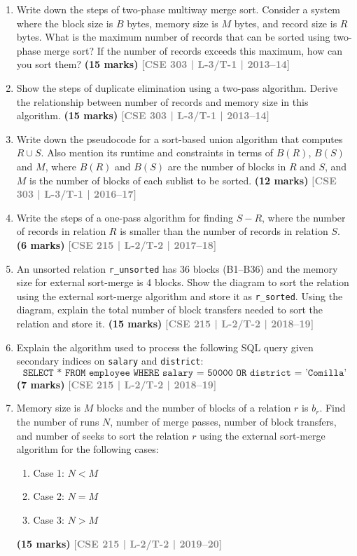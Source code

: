 \documentclass[12pt,a3paper]{article}
\newcommand{\yr}[1]{\hfill\textcolor{gray}{\small\textbf{[#1]}}}
\newcommand{\mk}[1]{\textcolor{orange!70!black}{\small\textbf{(#1 marks)}}}
\begin{document}
\begin{enumerate}
\item Write down the steps of two-phase multiway merge sort. Consider a system where the block size is $B$ bytes, memory size is $M$ bytes, and record size is $R$ bytes. What is the maximum number of records that can be sorted using two-phase merge sort? If the number of records exceeds this maximum, how can you sort them?
\mk{15} \yr{CSE 303 | L-3/T-1 | 2013--14}

\item Show the steps of duplicate elimination using a two-pass algorithm. Derive the relationship between number of records and memory size in this algorithm.
\mk{15} \yr{CSE 303 | L-3/T-1 | 2013--14}

\item Write down the pseudocode for a sort-based union algorithm that computes $R \cup S$. Also mention its runtime and constraints in terms of $B(R)$, $B(S)$ and $M$, where $B(R)$ and $B(S)$ are the number of blocks in $R$ and $S$, and $M$ is the number of blocks of each sublist to be sorted.
\mk{12} \yr{CSE 303 | L-3/T-1 | 2016--17}

\item Write the steps of a one-pass algorithm for finding $S - R$, where the number of records in relation $R$ is smaller than the number of records in relation $S$.
\mk{6} \yr{CSE 215 | L-2/T-2 | 2017--18}

\item An unsorted relation \texttt{r\_unsorted} has 36 blocks (B1--B36) and the memory size for external sort-merge is 4 blocks. Show the diagram to sort the relation using the external sort-merge algorithm and store it as \texttt{r\_sorted}. Using the diagram, explain the total number of block transfers needed to sort the relation and store it.
  \mk{15} \yr{CSE 215 | L-2/T-2 | 2018--19}

\item Explain the algorithm used to process the following SQL query given secondary indices on \texttt{salary} and \texttt{district}:
\[\texttt{SELECT * FROM employee WHERE salary = 50000 OR district = 'Comilla'}\]
\mk{7} \yr{CSE 215 | L-2/T-2 | 2018--19}

\item Memory size is $M$ blocks and the number of blocks of a relation $r$ is $b_r$. Find the number of runs $N$, number of merge passes, number of block transfers, and number of seeks to sort the relation $r$ using the external sort-merge algorithm for the following cases:
\begin{enumerate}
  \item Case 1: $N < M$
  \item Case 2: $N = M$
  \item Case 3: $N > M$
\end{enumerate}
\mk{15} \yr{CSE 215 | L-2/T-2 | 2019--20}


\end{enumerate}
\end{document}
